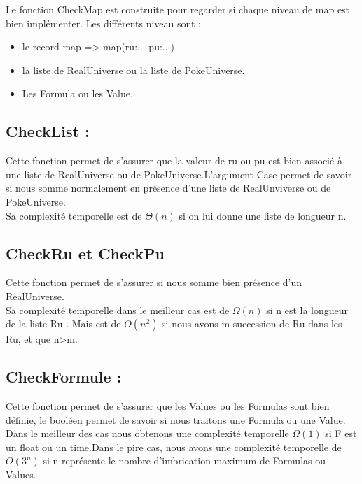 Le fonction CheckMap est construite pour regarder si chaque niveau de map est bien implémenter.
Les différents niveau sont :
\begin{itemize}
    \item le record map => map(ru:... pu:...)
    \item la liste de RealUniverse ou la liste de PokeUniverse. 
    \item Les Formula ou les Value.
\end{itemize}
\subsection{CheckList :}
Cette fonction permet de s'assurer que la valeur de ru ou pu est bien associé à une liste de RealUniverse ou de PokeUniverse.L'argument Case permet de savoir si nous somme normalement en présence d'une liste de RealUnviverse ou de PokeUniverse.
\\Sa complexité temporelle est de $\Theta(n)$ si on lui donne une liste de longueur n.
\subsection{CheckRu et CheckPu}
Cette fonction permet de s'assurer si nous somme bien présence d'un RealUniverse.
\\Sa complexité temporelle dans le meilleur cas est de $\Omega(n)$ si n est la longueur de la liste Ru . Mais est de $O(n^2)$ si nous avons m succession de Ru dans les Ru, et que n>m.
\subsection{CheckFormule :}
Cette fonction permet de s'assurer que les Values ou les Formulas sont bien définie, le booléen permet de savoir si nous traitons une Formula ou une Value.
\\Dans le meilleur des cas nous obtenons une complexité temporelle $\Omega(1)$ si F est un float ou un time.Dans le pire cas, nous avons une complexité temporelle de $O(3^n)$ si n représente le nombre d'imbrication maximum de Formulas ou Values.